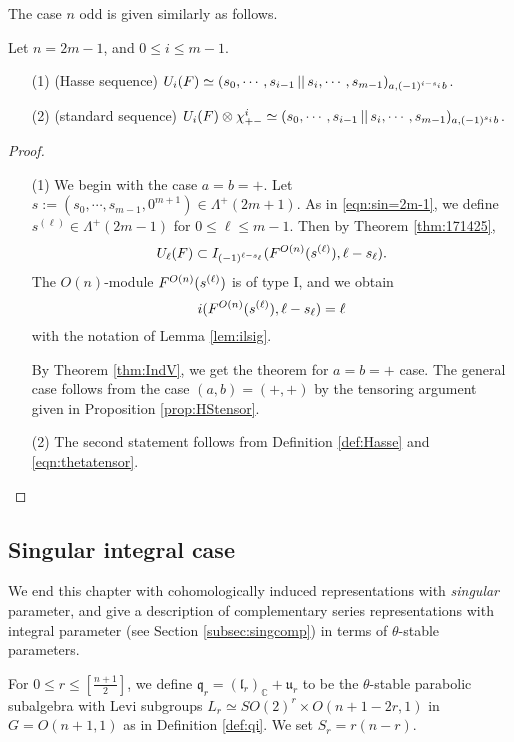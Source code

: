 The case $n$ odd is given similarly as follows.  
\begin{theorem}
\label{thm:171471b}
Let $n=2m-1$, 
 and $0 \le i \le m-1$.  
\begin{enumerate}
\item[{\rm{(1)}}]
{\rm{(Hasse sequence)}}\enspace
$U_i(F) \simeq ({s_0, \cdots, s_{i-1}}\,||\,{s_i, \cdots, s_{m-1}})_{a, (-1)^{i-s_i} b}$.  
\item[{\rm{(2)}}]
{\rm{(standard sequence)}}\enspace
$U_i(F) \otimes \chi_{+-}^i \simeq 
({s_0, \cdots, s_{i-1}}\,||\,{s_i, \cdots, s_{m-1}})_{a, (-1)^{s_i}b}$. 
\end{enumerate}
\end{theorem}
\begin{proof}
\begin{enumerate}
\item[(1)]
We begin with the case $a=b=+$.  
Let $s:=(s_0,\cdots,s_{m-1},0^{m+1}) \in \Lambda^+(2m+1)$.  
As in \eqref{eqn:sin=2m-1}, 
 we define $s^{(\ell)} \in \Lambda^+(2m-1)$
 for $0 \le \ell \le m-1$.  
Then by Theorem \ref{thm:171425}, 
\[
  U_\ell(F) 
  \subset 
  I_{(-1)^{\ell-s_{\ell}}}(F^{{O(n)}}({s^{(\ell)}}), \ell-s_\ell).  
\]
The $O(n)$-module $F^{{O(n)}}({s^{(\ell)}})$ is of type I, 
 and we obtain
\[
  i(F^{{O(n)}}({s^{(\ell)}}), \ell-s_\ell)=\ell
\]
 with the notation of Lemma \ref{lem:ilsig}.  

By Theorem \ref{thm:IndV}, 
 we get the theorem for $a=b=+$ case.  
The general case follows from the case
 $(a,b)=(+,+)$
 by the tensoring argument given in Proposition \ref{prop:HStensor}.  
\item[(2)]
The second statement follows from Definition \ref{def:Hasse}
 and \eqref{eqn:thetatensor}.  
\end{enumerate}
\end{proof}

\subsection{Singular integral case}
\label{subsec:Aqsing}
We end this chapter 
 with cohomologically induced representations
 with {\it{singular}} parameter,
 and give a description 
 of complementary series representations
 with integral parameter
 (see Section \ref{subsec:singcomp})
 in terms of $\theta$-stable parameters.  



For $0 \le r \le [\frac{n+1}{2}]$,
 we define ${\mathfrak {q}}_r = ({\mathfrak {l}}_r)_{\mathbb{C}}
 +{\mathfrak {u}}_r$
 to be the $\theta$-stable parabolic subalgebra
 with Levi subgroups
$
  L_r \simeq SO(2)^r \times O(n+1-2r, 1)
$
 in $G=O(n+1,1)$ as in Definition \ref{def:qi}.  
We set $S_r = r(n-r)$.  


